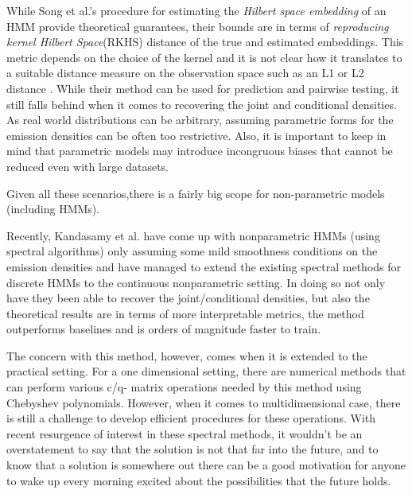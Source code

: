 While Song et al.'s \cite{ref20} procedure for estimating the \textit{Hilbert space embedding} of an HMM provide theoretical guarantees, their bounds are in terms of \textit{reproducing kernel Hilbert Space}(RKHS) distance of the true and estimated embeddings. This metric depends on the choice of the kernel and it is not clear how it translates to a suitable distance measure on the observation space such as an L1 or L2 distance \cite{ref27}. While their method can be used for prediction and pairwise testing, it still falls behind when it comes to recovering the joint and conditional densities. 
\newline
\newline
As real world distributions can be arbitrary, assuming parametric forms for the emission densities can be often too restrictive. Also, it is important to keep in mind that parametric models may introduce incongruous biases that cannot be reduced even with large datasets. 

Given all these scenarios,there is a fairly big scope for non-parametric models (including HMMs).

Recently, Kandasamy et al.\cite{ref27} have come up with nonparametric HMMs (using spectral algorithms) only assuming some mild smoothness conditions on the emission densities and have managed to extend the existing spectral methods for discrete HMMs to the continuous nonparametric setting. In doing so not only have they been able to recover the
joint/conditional densities, but also the theoretical results are in terms of more interpretable metrics, the
method outperforms baselines and is orders of magnitude faster to train.

The concern with this method, however, comes when it is extended to the practical setting.\newline
For a one dimensional setting, there are numerical methods that can perform various c/q- matrix operations needed by this method using Chebyshev polynomials.
However, when it comes to multidimensional case, there is still a challenge to develop efficient procedures for these operations.\newline 
With recent resurgence of interest in these spectral methods, it wouldn't be an overstatement to say that the solution is not that far into the future, and to know that a solution is somewhere out there can be a good motivation for anyone to wake up every morning excited about the possibilities that the future holds. 



